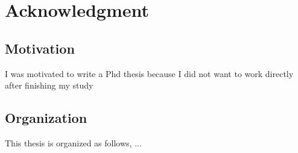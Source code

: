 \chapter{Acknowledgment}
\section{Motivation}
I was motivated to write a Phd thesis because I did not want to work directly after finishing my study
\section{Organization}
This thesis is organized as follows, ...
